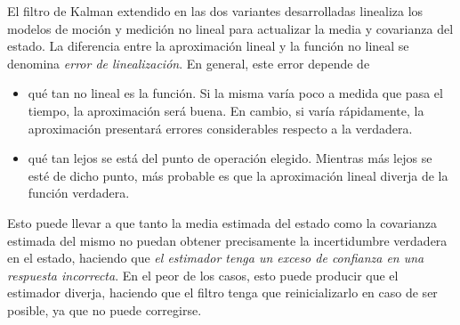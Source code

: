 El filtro de Kalman extendido en las dos variantes desarrolladas linealiza los modelos de moción y medición no lineal para actualizar la media y covarianza del estado. La diferencia entre la aproximación lineal y la función no lineal se denomina \textit{error de linealización}. En general, este error depende de 
\begin{itemize}
    \item qué tan no lineal es la función. Si la misma varía poco a medida que pasa el tiempo, la aproximación será buena. En cambio, si varía rápidamente, la aproximación presentará errores considerables respecto a la verdadera.
    \item qué tan lejos se está del punto de operación elegido. Mientras más lejos se esté de dicho punto, más probable es que la aproximación lineal diverja de la función verdadera.
\end{itemize}

Esto puede llevar a que tanto la media estimada del estado como la covarianza estimada del mismo no puedan obtener precisamente la incertidumbre verdadera en el estado, haciendo que \textit{el estimador tenga un exceso de confianza en una respuesta incorrecta}. En el peor de los casos, esto puede producir que el estimador diverja, haciendo que el filtro tenga que reinicializarlo en caso de ser posible, ya que no puede corregirse.

